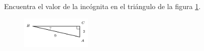 \question[15]  Encuentra el valor de la incógnita en el triángulo de la figura \ref{fig:angle_functrig_09}.
\begin{figure}[H]
    \begin{center}
        \includegraphics[width=0.3\textwidth]{../images/angle_functrig_09.png}
    \end{center}
    \caption{}
    \label{fig:angle_functrig_09}
\end{figure}